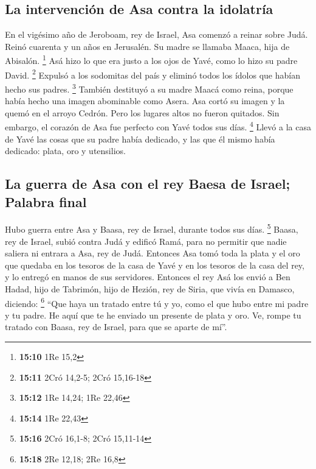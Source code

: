 \hypertarget{la-intervenciuxf3n-de-asa-contra-la-idolatruxeda}{%
\subsection{La intervención de Asa contra la
idolatría}\label{la-intervenciuxf3n-de-asa-contra-la-idolatruxeda}}

 En el vigésimo año de Jeroboam, rey de Israel, Asa
comenzó a reinar sobre Judá.  Reinó cuarenta y un años en
Jerusalén. Su madre se llamaba Maaca, hija de Abisalón. \footnote{\textbf{15:10}
  1Re 15,2}  Asá hizo lo que era justo a los ojos de
Yavé, como lo hizo su padre David. \footnote{\textbf{15:11} 2Cró 14,2-5;
  2Cró 15,16-18}  Expulsó a los sodomitas del país y
eliminó todos los ídolos que habían hecho sus padres. \footnote{\textbf{15:12}
  1Re 14,24; 1Re 22,46}  También destituyó a su madre
Maacá como reina, porque había hecho una imagen abominable como Asera.
Asa cortó su imagen y la quemó en el arroyo Cedrón.  Pero
los lugares altos no fueron quitados. Sin embargo, el corazón de Asa fue
perfecto con Yavé todos sus días. \footnote{\textbf{15:14} 1Re 22,43}
 Llevó a la casa de Yavé las cosas que su padre había
dedicado, y las que él mismo había dedicado: plata, oro y utensilios.

\hypertarget{la-guerra-de-asa-con-el-rey-baesa-de-israel-palabra-final}{%
\subsection{La guerra de Asa con el rey Baesa de Israel; Palabra
final}\label{la-guerra-de-asa-con-el-rey-baesa-de-israel-palabra-final}}

 Hubo guerra entre Asa y Baasa, rey de Israel, durante
todos sus días. \footnote{\textbf{15:16} 2Cró 16,1-8; 2Cró 15,11-14}
 Baasa, rey de Israel, subió contra Judá y edificó Ramá,
para no permitir que nadie saliera ni entrara a Asa, rey de Judá.
 Entonces Asa tomó toda la plata y el oro que quedaba en
los tesoros de la casa de Yavé y en los tesoros de la casa del rey, y lo
entregó en manos de sus servidores. Entonces el rey Asá los envió a Ben
Hadad, hijo de Tabrimón, hijo de Hezión, rey de Siria, que vivía en
Damasco, diciendo: \footnote{\textbf{15:18} 2Re 12,18; 2Re 16,8}
 ``Que haya un tratado entre tú y yo, como el que hubo
entre mi padre y tu padre. He aquí que te he enviado un presente de
plata y oro. Ve, rompe tu tratado con Baasa, rey de Israel, para que se
aparte de mí''.

